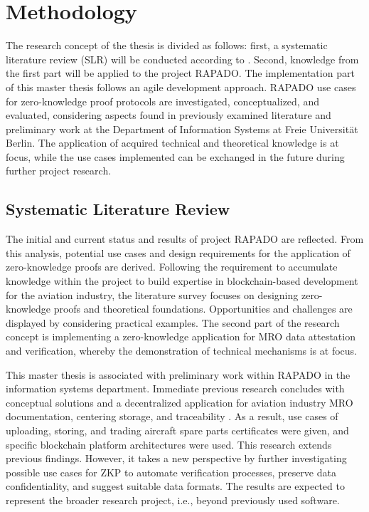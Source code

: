 \chapter{Methodology}
The research concept of the thesis is divided as follows: first, a systematic literature review (SLR) will be conducted according to \cite{HevnerAR2004DSiI, vomBrockeJan2019TDgs, Webster2002AnalyzingTP}. Second, knowledge from the first part will be applied to the project RAPADO. The implementation part of this master thesis follows an agile development approach. RAPADO use cases for zero-knowledge proof protocols are investigated, conceptualized, and evaluated, considering aspects found in previously examined literature and preliminary work at the Department of Information Systems at Freie Universit{\"a}t Berlin. The application of acquired technical and theoretical knowledge is at focus, while the use cases implemented can be exchanged in the future during further project research. 

\section{Systematic Literature Review}
The initial and current status and results of project RAPADO are reflected. From this analysis, potential use cases and design requirements for the application of zero-knowledge proofs are derived. Following the requirement to accumulate knowledge within the project to build expertise in blockchain-based development for the aviation industry, the literature survey focuses on designing zero-knowledge proofs and theoretical foundations. Opportunities and challenges are displayed by considering practical examples. The second part of the research concept is implementing a zero-knowledge application for MRO data attestation and verification, whereby the demonstration of technical mechanisms is at focus.

This master thesis is associated with preliminary work within RAPADO in the information systems department. Immediate previous research concludes with conceptual solutions and a decentralized application for aviation industry MRO documentation, centering storage, and traceability \citep{ZedelJ}. As a result, use cases of uploading, storing, and trading aircraft spare parts certificates were given, and specific blockchain platform architectures were used. This research extends previous findings. However, it takes a new perspective by further investigating possible use cases for ZKP to automate verification processes, preserve data confidentiality, and suggest suitable data formats. The results are expected to represent the broader research project, i.e., beyond previously used software.

